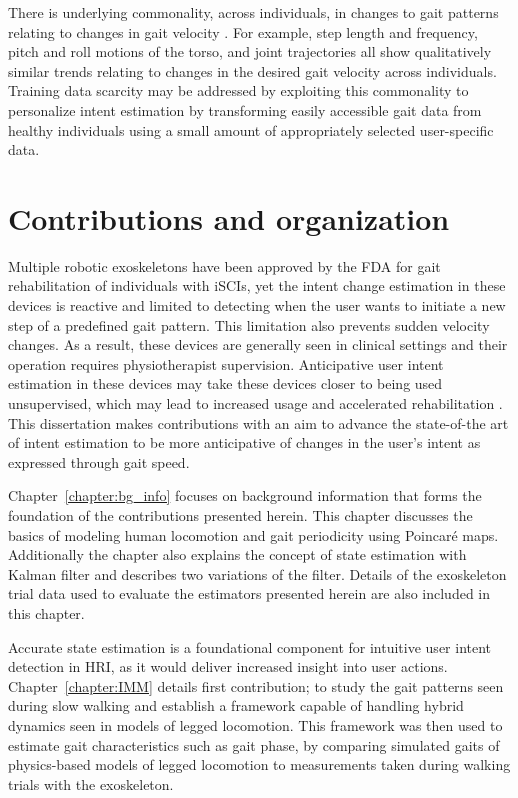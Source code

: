 There is underlying commonality, across individuals, in changes to gait patterns relating to changes in gait velocity \cite{li1999coordination}. For example, step length and frequency, pitch and roll motions of the torso, and joint trajectories all show qualitatively similar trends relating to changes in the desired gait velocity across individuals. Training data scarcity may be addressed by exploiting this commonality to personalize intent estimation by transforming easily accessible gait data from healthy individuals using a small amount of appropriately selected user-specific data.

\section{Contributions and organization}

Multiple robotic exoskeletons have been approved by the FDA for gait rehabilitation of individuals with iSCIs, yet the intent change estimation in these devices is reactive and limited to detecting when the user wants to initiate a new step of a predefined gait pattern. This limitation also prevents sudden velocity changes. As a result, these devices are generally seen in clinical settings and their operation requires physiotherapist supervision. Anticipative user intent estimation in these devices may take these devices closer to being used unsupervised, which may lead to increased usage and accelerated rehabilitation \cite{hidler2011role}. This dissertation makes contributions with an aim to advance the state-of-the art of intent estimation to be more anticipative of changes in the user's intent as expressed through gait speed.

Chapter~\ref{chapter:bg_info} focuses on background information that forms the foundation of the contributions presented herein. This chapter discusses the basics of modeling human locomotion and gait periodicity using Poincar\'e maps. Additionally the chapter also explains the concept of state estimation with Kalman filter and describes two variations of the filter. Details of the exoskeleton trial data used to evaluate the estimators presented herein are also included in this chapter.

Accurate state estimation is a foundational component for intuitive user intent detection in HRI, as it would deliver increased insight into user actions. Chapter~\ref{chapter:IMM} details first contribution; to study the gait patterns seen during slow walking and establish a framework capable of handling hybrid dynamics seen in models of legged locomotion. This framework was then used to estimate gait characteristics such as gait phase, by comparing simulated gaits of physics-based models of legged locomotion to measurements taken during walking trials with the exoskeleton. 

